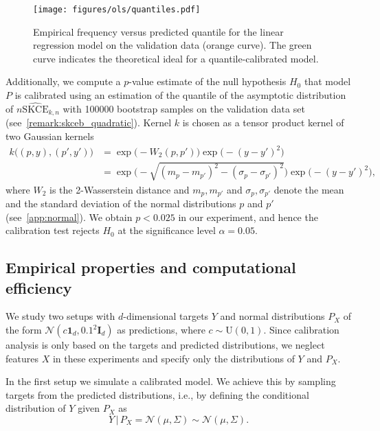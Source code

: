 \documentclass{article}
\begin{document}
\begin{figure}[hpt]
    \begin{center}
        \texttt{[image: figures/ols/quantiles.pdf]}
        \caption{Empirical frequency versus predicted quantile for the linear regression
        model on the validation data (orange curve). The green curve indicates the theoretical ideal
        for a quantile-calibrated model.}
        \label{fig:ols_quantiles}
    \end{center}
\end{figure}

Additionally, we compute a $p$-value estimate of the null hypothesis $H_0$ that model $P$
is calibrated using an estimation of the quantile of the asymptotic distribution
of $n \widehat{\mathrm{SKCE}}_{k,n}$ with 100000 bootstrap samples
on the validation data set (see~\cref{remark:skceb_quadratic}). Kernel $k$ is chosen
as a tensor product kernel of two Gaussian kernels
\begin{equation*}
    \begin{split}
        k\big((p, y), (p', y')\big) &= \exp{\big(-W_2(p, p')\big)} \exp{\big(-(y - y')^2 \big)} \\
        &= \exp{\big(-\sqrt{(m_p - m_{p'})^2 - (\sigma_p - \sigma_{p'})^2}\big)} \exp{\big(- (y - y')^2\big)},
    \end{split}
\end{equation*}
where $W_2$ is the 2-Wasserstein distance and $m_p, m_{p'}$ and $\sigma_p, \sigma_{p'}$ denote
the mean and the standard deviation of the normal distributions $p$ and $p'$ (see~\cref{app:normal}).
We obtain $p < 0.025$ in our experiment, and hence the calibration test rejects $H_0$ at the
significance level $\alpha = 0.05$.

\subsection{Empirical properties and computational efficiency}

We study two setups with $d$-dimensional targets $Y$ and normal distributions $P_X$
of the form $\mathcal{N}(c \mathbf{1}_d, 0.1^2 \mathbf{I}_d)$ as predictions,
where $c \sim \mathrm{U}(0, 1)$.
Since calibration analysis is only based on the targets and predicted distributions,
we neglect features $X$ in these experiments and specify only the distributions of
$Y$ and $P_X$.

In the first setup we simulate a calibrated model. We achieve this by sampling
targets from the predicted distributions, i.e., by defining the conditional
distribution of $Y$ given $P_X$ as
\begin{equation*}
    Y \,|\, P_X = \mathcal{N}(\mu, \Sigma) \sim \mathcal{N}(\mu, \Sigma).
\end{equation*}
\end{document}
